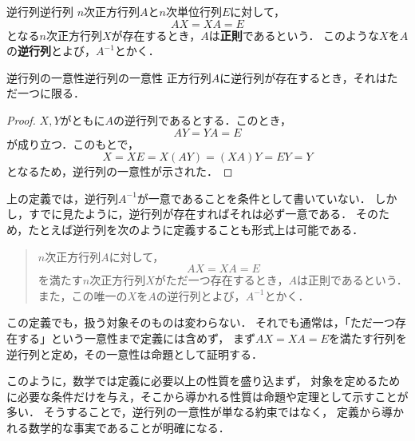 \begin{definition}{逆行列}{逆行列}
  $n$次正方行列$A$と$n$次単位行列$E$に対して，
  \[
    AX = XA = E
  \]
  となる$n$次正方行列$X$が存在するとき，$A$は\textbf{正則}であるという．
  このような$X$を$A$の\textbf{逆行列}とよび，$A^{-1}$とかく．
\end{definition}

\begin{prop}{逆行列の一意性}{逆行列の一意性}
  正方行列$A$に逆行列が存在するとき，それはただ一つに限る．
\end{prop}

\begin{tleftbar}
\begin{proof}
  $X,Y$がともに$A$の逆行列であるとする．このとき，
  \[
    AY = YA = E
  \]
  が成り立つ．このもとで，
  \[
    X = XE = X(AY) = (XA)Y = EY = Y
  \]
  となるため，逆行列の一意性が示された．
\end{proof}
\end{tleftbar}

\begin{remark}[定義は最小限にとどめる]
  上の定義では，逆行列$A^{-1}$が一意であることを条件として書いていない．
  しかし，すでに見たように，逆行列が存在すればそれは必ず一意である．
  そのため，たとえば逆行列を次のように定義することも形式上は可能である．

  \begin{quotation}
    $n$次正方行列$A$に対して，
    \[
      AX = XA = E
    \]
    を満たす$n$次正方行列$X$がただ一つ存在するとき，$A$は正則であるという．
    また，この唯一の$X$を$A$の逆行列とよび，$A^{-1}$とかく．
  \end{quotation}

  この定義でも，扱う対象そのものは変わらない．
  それでも通常は，「ただ一つ存在する」という一意性まで定義には含めず，
  まず$AX = XA = E$を満たす行列を逆行列と定め，その一意性は命題として証明する．

  このように，数学では定義に必要以上の性質を盛り込まず，
  対象を定めるために必要な条件だけを与え，そこから導かれる性質は命題や定理として示すことが多い．
  そうすることで，逆行列の一意性が単なる約束ではなく，
  定義から導かれる数学的な事実であることが明確になる．
\end{remark}

